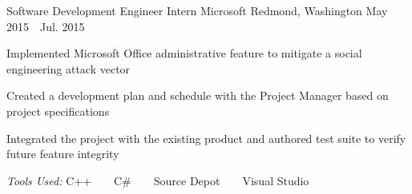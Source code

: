 \begin{cventries}
  \cventry
    {Software Development Engineer Intern} %
    {Microsoft} %
    {Redmond, Washington} %
    {May 2015~\textendash~Jul. 2015} %
    {
      \begin{cvitems} %
        \item {Implemented Microsoft Office administrative feature to mitigate a social engineering attack vector}
        \item {Created a development plan and schedule with the Project Manager based on project specifications}
        \item {Integrated the project with the existing product and authored test suite to verify future feature integrity}
      \end{cvitems}
    }
    {
      \emph{Tools Used:} C++ ~ \bullet ~ C\# ~ \bullet ~ Source Depot ~ \bullet ~ Visual Studio
    }

\end{cventries}
